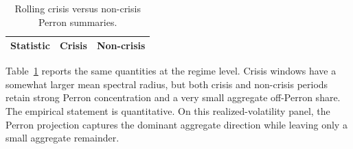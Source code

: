 \documentclass[11pt,a4paper]{amsart}
\theoremstyle{plain}
\theoremstyle{definition}
\theoremstyle{remark}
\begin{document}
\begin{table}[t]
\centering
\small
\begin{tabular}{lcc}
\hline
Statistic & Crisis & Non-crisis \\
\hline

\end{tabular}
\caption{Rolling crisis versus non-crisis Perron summaries.}
\label{tab:perron-crisis}
\end{table}

Table~\ref{tab:perron-crisis} reports the same quantities at the regime level.  Crisis windows have
a somewhat larger mean spectral radius, but both crisis and non-crisis periods retain strong Perron
concentration and a very small aggregate off-Perron share.  The empirical statement is
quantitative.  On this realized-volatility panel, the Perron projection captures the dominant
aggregate direction while leaving only a small aggregate remainder.



\end{document}
